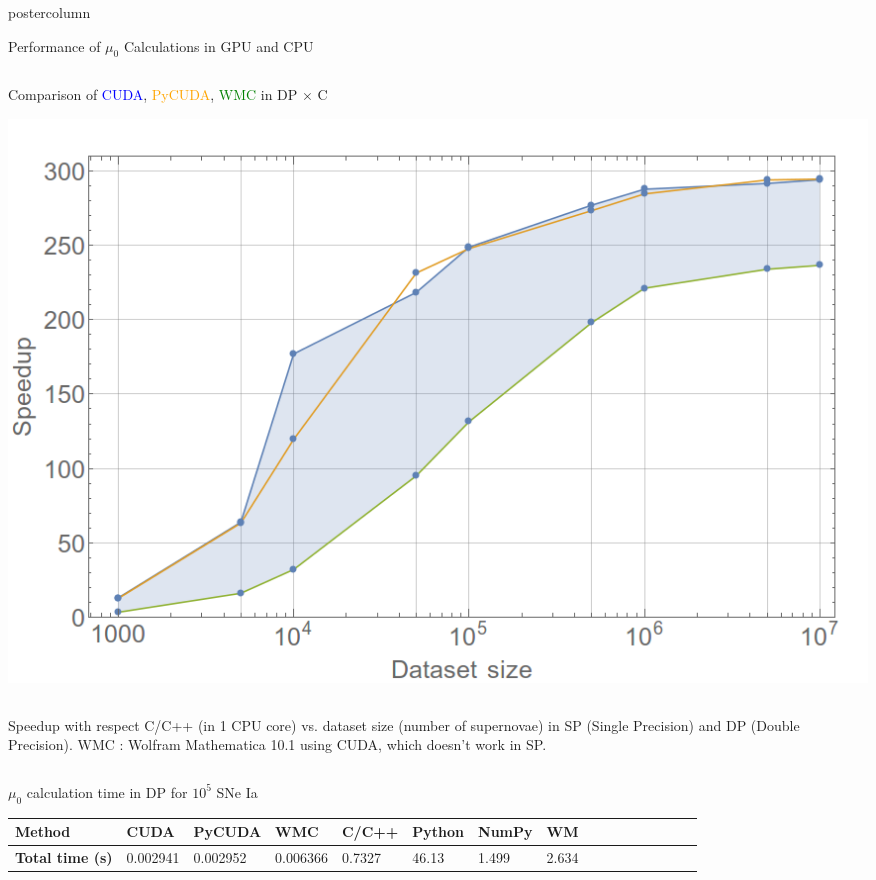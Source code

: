 \documentclass[final,hyperref={pdfpagelabels=false}]{beamer}
\newlength{\columnheight}
\begin{document}
\begin{frame}
\begin{columns}
\begin{column}{.49\textwidth}
\begin{beamercolorbox}[center,wd=\textwidth]{postercolumn}
\begin{minipage}[T]{.95\textwidth}
{\begin{block}{Performance of $\mu_0$ Calculations in GPU and CPU}
\begin{columns}
\begin{column}{.45\textwidth}
\begin{exampleblock}{\small \centering Comparison of \textcolor{blue}{CUDA}, \textcolor{orange}{PyCUDA}, \textcolor{green}{WMC} in DP $\times$ C}
\begin{center}
                      \includegraphics[scale=0.8]{Grafico_ganho_x_num_DP.png}
                    \end{center}
                  \end{exampleblock}
                \end{column}                                
              \end{columns}
              \vspace{0.2cm}
              {\small Speedup with respect C/C++ (in 1 CPU core) vs. dataset size (number of supernovae) in SP (Single Precision) and DP (Double Precision). WMC : Wolfram Mathematica 10.1 using CUDA, which doesn't work in SP.}
              \vspace{.005\columnheight}
              \begin{columns}
              \begin{column}{.95\textwidth}
                \begin{exampleblock}{$\mu_0$ calculation time in DP for $10^5$ SNe Ia}
                  \begin{table}
                    \begin{tabular}{@{} p{.17\linewidth} | p{.10\linewidth} p{.12\linewidth} p{.10\linewidth} p{.10\linewidth} p{.10\linewidth} p{.10\linewidth} p{.08\linewidth} r r r r r r r r @{}}
                      \textbf{Method} &\textbf{CUDA} &\textbf{PyCUDA} &\textbf{WMC} &\textbf{C/C++} &\textbf{Python}  &\textbf{NumPy} & \textbf{WM} \\ 
                      \toprule \textbf{Total time (s)} & 0.002941 & 0.002952 & 0.006366 & 0.7327 & 46.13 & 1.499 & 2.634  \\ 

\end{tabular}
\end{table}
\end{exampleblock}
\end{column}
\end{columns}
\end{block}}
\end{minipage}
\end{beamercolorbox}
\end{column}
\end{columns}
\end{frame}
\end{document}
